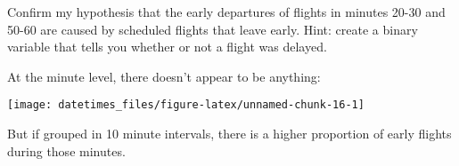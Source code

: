 \documentclass[]{book}
\newenvironment{Shaded}{\begin{snugshade}}{\end{snugshade}}
\newcommand{\DataTypeTok}[1]{\textcolor[rgb]{0.13,0.29,0.53}{#1}}
\newcommand{\DecValTok}[1]{\textcolor[rgb]{0.00,0.00,0.81}{#1}}
\newcommand{\KeywordTok}[1]{\textcolor[rgb]{0.13,0.29,0.53}{\textbf{#1}}}
\newcommand{\NormalTok}[1]{#1}
\newcommand{\OperatorTok}[1]{\textcolor[rgb]{0.81,0.36,0.00}{\textbf{#1}}}
\newcommand{\StringTok}[1]{\textcolor[rgb]{0.31,0.60,0.02}{#1}}
\theoremstyle{plain}
\theoremstyle{remark}
\theoremstyle{definition}
\theoremstyle{definition}
\theoremstyle{definition}
\theoremstyle{remark}
\begin{document}
Confirm my hypothesis that the early departures of flights in minutes
20-30 and 50-60 are caused by scheduled flights that leave early. Hint:
create a binary variable that tells you whether or not a flight was
delayed.

At the minute level, there doesn't appear to be anything:

\begin{Shaded}
\end{Shaded}

\begin{center}\texttt{[image: datetimes\_files/figure-latex/unnamed-chunk-16-1]} \end{center}

But if grouped in 10 minute intervals, there is a higher proportion of
early flights during those minutes.

\begin{Shaded}
\end{Shaded}
\end{document}
